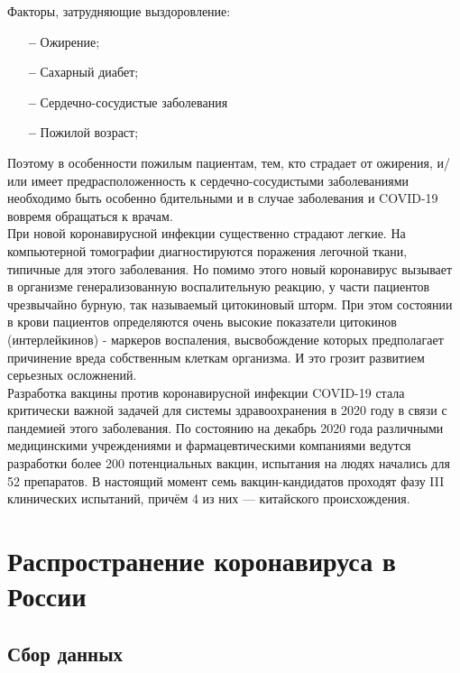 \documentclass[a4paper, 12pt]{extarticle}
\begin{document}
Факторы, затрудняющие выздоровление:
\begin{itemize}
    \item[\bfseries--] Ожирение;
    \item[\bfseries--] Сахарный диабет;
    \item[\bfseries--] Сердечно-сосудистые заболевания
    \item[\bfseries--] Пожилой возраст;
\end{itemize}

Поэтому в особенности пожилым пациентам, тем, кто страдает от ожирения, и/или имеет предрасположенность к сердечно-сосудистыми заболеваниями необходимо быть особенно бдительными и в случае заболевания и COVID-19 вовремя обращаться к врачам.
\\

При новой коронавирусной инфекции существенно страдают легкие. На компьютерной томографии диагностируются поражения легочной ткани, типичные для этого заболевания. Но помимо этого новый коронавирус вызывает в организме генерализованную воспалительную реакцию, у части пациентов чрезвычайно бурную, так называемый цитокиновый шторм. При этом состоянии в крови пациентов определяются очень высокие показатели цитокинов (интерлейкинов) - маркеров воспаления, высвобождение которых предполагает причинение вреда собственным клеткам организма. И это грозит развитием серьезных осложнений.
\\

Разработка вакцины против коронавирусной инфекции COVID-19 стала критически важной задачей для системы здравоохранения в 2020 году в связи с пандемией этого заболевания. По состоянию на декабрь 2020 года различными медицинскими учреждениями и фармацевтическими компаниями ведутся разработки более 200 потенциальных вакцин, испытания на людях начались для 52 препаратов. В настоящий момент семь вакцин-кандидатов проходят фазу III клинических испытаний, причём 4 из них — китайского происхождения.
\newpage

\section{Распространение коронавируса в России}
\subsection{Сбор данных}
\end{document}
